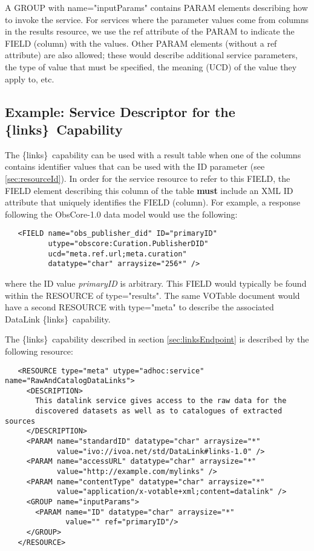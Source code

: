 \documentclass[11pt,a4paper]{ivoa}
\newcommand{\blinks}{\{links\}}
\newcommand{\attval}[2]{#1={\allowbreak}{"}#2{"}}
\begin{document}
A GROUP with \attval{name}{inputParams} contains PARAM elements describing
how to invoke the service. For services where the parameter values
come from columns in the results resource, we use the ref attribute of
the PARAM to indicate the FIELD (column) with the values. Other PARAM
elements (without a ref attribute) are also allowed; these would describe
additional service parameters, the type of value that must be specified,
the meaning (UCD) of the value they apply to, etc.


\subsection{Example: Service Descriptor for the \blinks\ Capability}

The \blinks\ capability can be used with a result table when one of the
columns contains identifier values that can be used with the ID parameter
(see \ref{sec:resourceId}).
In order for the service resource to refer to this FIELD,
the FIELD element describing this column of the table
{\bf must} include an XML ID attribute
that uniquely identifies the FIELD (column).
For example, a response following the ObsCore-1.0 data model
would use the following:
\begin{verbatim}
   <FIELD name="obs_publisher_did" ID="primaryID"
          utype="obscore:Curation.PublisherDID"
          ucd="meta.ref.url;meta.curation"
          datatype="char" arraysize="256*" />
\end{verbatim}
where the ID value {\em primaryID\/} is arbitrary.
This FIELD would typically
be found within the RESOURCE of \attval{type}{results}. The same VOTable
document would have a second RESOURCE with \attval{type}{meta} to describe
the associated DataLink \blinks\ capability.

The \blinks\ capability described in section \ref{sec:linksEndpoint}
is described by the following resource:
\begin{verbatim}
   <RESOURCE type="meta" utype="adhoc:service" name="RawAndCatalogDataLinks">
     <DESCRIPTION>
       This datalink service gives access to the raw data for the
       discovered datasets as well as to catalogues of extracted sources
     </DESCRIPTION>
     <PARAM name="standardID" datatype="char" arraysize="*"
            value="ivo://ivoa.net/std/DataLink#links-1.0" />
     <PARAM name="accessURL" datatype="char" arraysize="*"
            value="http://example.com/mylinks" />
     <PARAM name="contentType" datatype="char" arraysize="*" 
            value="application/x-votable+xml;content=datalink" />
     <GROUP name="inputParams">
       <PARAM name="ID" datatype="char" arraysize="*"
              value="" ref="primaryID"/>
     </GROUP>
   </RESOURCE>
\end{verbatim}
\end{document}
